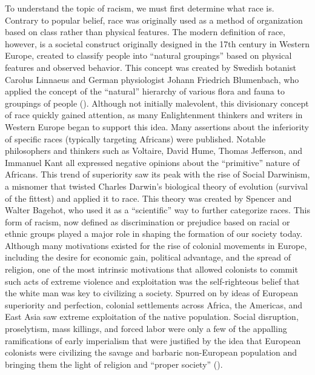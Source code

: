 To understand the topic of racism, we must first determine what race is. Contrary to popular belief, race was originally used as a method of organization based on class rather than physical features. The modern definition of race, however, is a societal construct originally designed in the 17th century in Western Europe, created to classify people into “natural groupings” based on physical features and observed behavior. This concept was created by Swedish botanist Carolus Linnaeus and German physiologist Johann Friedrich Blumenbach, who applied the concept of the “natural” hierarchy of various flora and fauna to groupings of people (\cite{smedley2024}). Although not initially malevolent, this divisionary concept of race quickly gained attention, as many Enlightenment thinkers and writers in Western Europe began to support this idea. Many assertions about the inferiority of specific races (typically targeting Africans) were published. Notable philosophers and thinkers such as Voltaire, David Hume, Thomas Jefferson, and Immanuel Kant all expressed negative opinions about the “primitive” nature of Africans. This trend of superiority saw its peak with the rise of Social Darwinism, a misnomer that twisted Charles Darwin’s biological theory of evolution (survival of the fittest) and applied it to race. This theory was created by Spencer and Walter Bagehot, who used it as a “scientific” way to further categorize races. This form of racism, now defined as discrimination or prejudice based on racial or ethnic groups played a major role in shaping the formation of our society today. Although many motivations existed for the rise of colonial movements in Europe, including the desire for economic gain, political advantage, and the spread of religion, one of the most intrinsic motivations that allowed colonists to commit such acts of extreme violence and exploitation was the self-righteous belief that the white man was key to civilizing a society. Spurred on by ideas of European superiority and perfection, colonial settlements across Africa, the Americas, and East Asia saw extreme exploitation of the native population. Social disruption, proselytism, mass killings, and forced labor were only a few of the appalling ramifications of early imperialism that were justified by the idea that European colonists were civilizing the savage and barbaric non-European population and bringing them the light of religion and “proper society” (\cite{kipling1899}).

